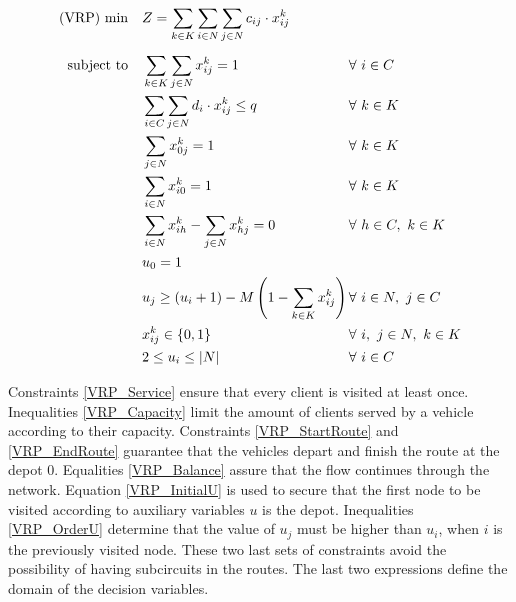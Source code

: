 \documentclass[preprint,review,12pt]{elsarticle}
\begin{document}
\begin{align}
	\text{(VRP) min} \quad      & Z = \sum\limits_{k\in K}\sum\limits_{i\in N}\sum\limits_{j\in N} c_{ij} \cdot x_{ij}^k    && \label{VRP_FObj}    \\[5pt]
	\noindent \text{subject to} \quad & \sum\limits_{k \in K}\sum\limits_{j \in N} x_{ij}^k = 1                    && \text{\hspace{-1cm}} \forall \ i \in C \label{VRP_Service} \\
	& \sum\limits_{i \in C}\sum\limits_{j \in N}d_i \cdot x_{ij}^k \leq q                 && \text{\hspace{-1cm}} \forall \ k \in K  \label{VRP_Capacity} \\
	& \sum\limits_{j \in N}x_{0j}^k = 1                                             && \text{\hspace{-1cm}} \forall \ k \in K \label{VRP_StartRoute} \\
	& \sum\limits_{i \in N}x_{i0}^k = 1                                             && \text{\hspace{-1cm}} \forall \ k \in K \label{VRP_EndRoute} \\
	& \sum\limits_{i \in N}x_{ih}^k - \sum\limits_{j \in N}x_{hj}^k = 0             && \text{\hspace{-1cm}} \forall \ h \in C,\ k \in K \label{VRP_Balance} \\
	& u_0 = 1                                                                       && \label{VRP_InitialU}\\
	& u_j \geq (u_i + 1) - M \left(1 - \sum\limits_{k \in K}x_{ij}^k \right) \qquad && \text{\hspace{-1cm}} \forall \ i \in N,\ j \in C \label{VRP_OrderU}\\
	& x_{ij}^{k} \in\{0,1\}                                                         && \text{\hspace{-1cm}} \forall \ i, \ j \in N,\ k \in K \label{VRP_DomainX}\\
	& 2 \leq u_i \leq |N|                                                           && \text{\hspace{-1cm}} \forall \ i \in C \label{VRP_DomainU}
\end{align}

Constraints \eqref{VRP_Service} ensure that every client is visited at least once. Inequalities \eqref{VRP_Capacity} limit the amount of clients served by a vehicle according to their capacity. Constraints \eqref{VRP_StartRoute} and \eqref{VRP_EndRoute} guarantee that the vehicles depart and finish the route at the depot 0. Equalities \eqref{VRP_Balance} assure that the flow continues through the network. Equation \eqref{VRP_InitialU} is used to secure that the first node to be visited according to auxiliary variables $u$ is the depot. Inequalities \eqref{VRP_OrderU} determine that the value of $u_j$ must be higher than $u_i$, when $i$ is the previously visited node. These two last sets of constraints avoid the possibility of having subcircuits in the routes. The last two expressions define the domain of the decision variables.
\end{document}

